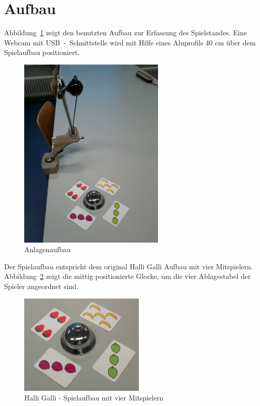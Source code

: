 
\section{Aufbau}
\label{sec:Kapitel}

Abbildung~\ref{fig:Anlage} zeigt den benutzten Aufbau zur Erfassung des Spielstandes. Eine Webcam mit USB~-~Schnittstelle wird mit Hilfe eines Aluprofils 40 cm über dem Spielaufbau positioniert.

\begin{figure}[]
    \centering
    \includegraphics[width=7cm]{Abbildungen/KameraAufbau}
    \caption[Anlage]{Anlagenaufbau}
    \label{fig:Anlage}
\end{figure}

Der Spielaufbau entspricht dem original Halli Galli Aufbau mit vier Mitspielern. Abbildung~\ref{fig:Spielaufbau} zeigt die mittig positionierte Glocke, um die vier Ablagestabel der Spieler angeordnet sind.

\begin{figure}[h]
    \centering
    \includegraphics[width=6cm]{Abbildungen/Aufbau4}
    \caption[Spielaufbau]{Halli Galli - Spielaufbau mit vier Mitspielern}
    \label{fig:Spielaufbau}
\end{figure}

